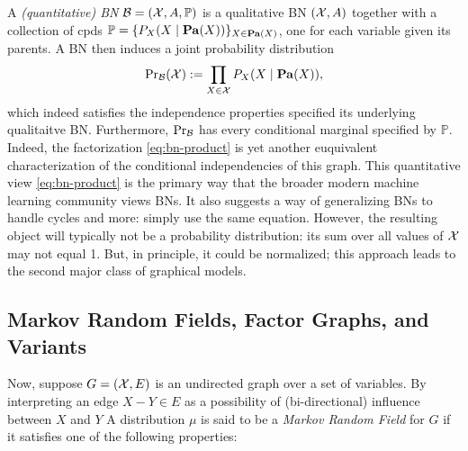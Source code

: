 A \emph{(quantitative) BN}
    $\mathcal B = (\mathcal X, A, \mathbb P)$ 
    is a qualitative BN $(\mathcal X, A)$ together with a collection 
    of cpds $\mathbb P = \{ P_X( X \mid \mathop{\mathbf{Pa}}\nolimits(X)) \}_{X \in \mathop{\mathbf{Pa}}\nolimits(X)}$,
    one for each variable given its parents. 
A BN then induces a joint probability distribution 
\begin{equation}
    \Pr\nolimits_{\cal B}(\mathcal X) := \prod_{X \in \mathcal X} P_X( X \mid \mathop{\mathbf{Pa}}\nolimits(X) ),
        \label{eq:bn-product}
\end{equation}
which indeed satisfies the independence properties specified its underlying qualitaitve BN. 
Furthermore, $\Pr_{\cal B}$ has every conditional marginal specified by $\mathbb P$. 
Indeed, the factorization \eqref{eq:bn-product} is yet another euquivalent characterization of the conditional independencies of this graph.  
This quantitative view \eqref{eq:bn-product} is the primary way that the broader modern machine learning community views BNs.
It also suggests a way of generalizing BNs to handle cycles and more: simply use the same equation.
However, the resulting object will typically not be a probability distribution: its sum over all values of $\mathcal X$ may not equal 1. 
But, in principle, it could be normalized;
    this approach leads to the second major class of graphical models.  



\subsection{Markov Random Fields, Factor Graphs, and Variants}
    \label{sec:prelim-fgs}

Now, suppose $G = (\mathcal X, E)$ is an undirected graph over a set of variables.
By interpreting an edge $X{-}Y \in E$ as a possibility of (bi-directional) influence between $X$ and $Y$
A distribution $\mu$ is said to be a \emph{Markov Random Field} for $G$ if it satisfies one of the following properties:

